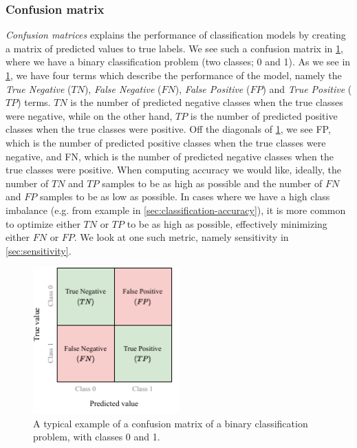 \subsubsection{Confusion matrix}
\label{sec:confusion-matrix}
\textit{Confusion matrices} explains the performance of classification models by creating a matrix of predicted values to true labels. We see such a confusion matrix in \cref{fig:confusion-matrix}, where we have a binary classification problem (two classes; 0 and 1). As we see in \cref{fig:confusion-matrix}, we have four terms which describe the performance of the model, namely the \textit{True Negative} ($TN$), \textit{False Negative} ($FN$), \textit{False Positive} ($FP$) and \textit{True Positive} ($TP$) terms. $TN$ is the number of predicted negative classes when the true classes were negative, while on the other hand, $TP$ is the number of predicted positive classes when the true classes were positive. Off the diagonals of \cref{fig:confusion-matrix}, we see FP, which is the number of predicted positive classes when the true classes were negative, and FN, which is the number of predicted negative classes when the true classes were positive. When computing accuracy we would like, ideally, the number of $TN$ and $TP$ samples to be as high as possible and the number of $FN$ and $FP$ samples to be as low as possible. In cases where we have a high class imbalance (e.g. from example in \cref{sec:classification-accuracy}), it is more common to optimize either $TN$ or $TP$ to be as high as possible, effectively minimizing either $FN$ or $FP$. We look at one such metric, namely sensitivity in \cref{sec:sensitivity}.
\begin{figure}
    \centering
    \includegraphics[width=0.5\textwidth]{thesis/figures/confusion-matrix_cropped.pdf}
    \caption{A typical example of a confusion matrix of a binary classification problem, with classes 0 and 1.}
    \label{fig:confusion-matrix}
\end{figure}

